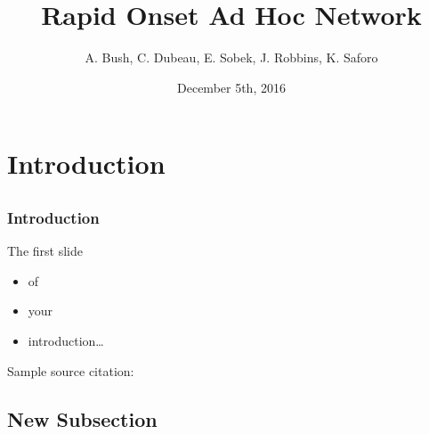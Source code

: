 \documentclass[compress]{beamer}
\title[Short Title]{Rapid Onset Ad Hoc Network}
\author[Short Author Names]{
  A. Bush,
  C. Dubeau,
  E. Sobek,
  J. Robbins,
  K. Saforo
}
\date{December 5th, 2016}
\institute{\vspace{0.2em}
  \texttt{[image: macewan]}\\[0.25em]
}
\begin{document}


\section{Introduction}
\subsection*{}

\begin{frame}[t]
  \frametitle{Introduction}

  The first slide
  \begin{itemize}
  \item of
  \item your
  \item introduction\dots
  \end{itemize}

  \vfill

  \begin{tiny}
    \begin{minipage}{1.0\linewidth}
      Sample source citation: 
    \end{minipage}
  \end{tiny}
  
\end{frame}

\subsection{New Subsection}
\end{document}
